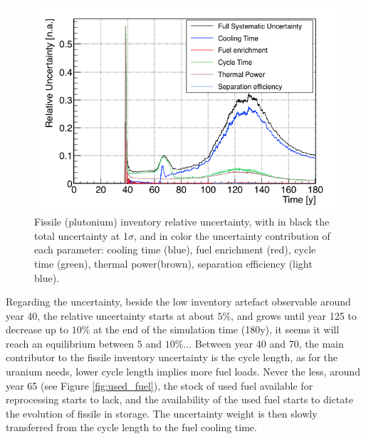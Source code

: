 \documentclass{anstrans}
\begin{document}
\begin{figure}[h!!] %
    \centering
    \includegraphics[scale=0.35]{pu_uncer}
    \caption{Fissile (plutonium) inventory relative uncertainty, with
    in black the total uncertainty at 1$\sigma$, and in color the uncertainty
    contribution of each parameter: cooling time (blue), fuel enrichment (red),
    cycle time (green), thermal power(brown), separation efficiency (light
    blue).}\label{fig:pu_uncer}
\end{figure}

Regarding the uncertainty, beside the low inventory artefact observable around
year 40, the relative uncertainty starts at about $5\%$, and grows until year
125 to decrease up to $10\%$ at the end of the simulation time (180y), it seems
it will reach an equilibrium between $5$ and $10\%$...
Between year 40 and 70, the main contributor to the fissile inventory
uncertainty is the cycle length, as for the uranium needs, lower cycle length
implies more fuel loads. Never the less, around year 65 (see Figure
\ref{fig:used_fuel}), the stock of used fuel available for reprocessing starts
to lack, and the availability of the used fuel starts to dictate the evolution
of fissile in storage. The uncertainty weight is then slowly transferred from
the cycle length to the fuel cooling time.
\end{document}
